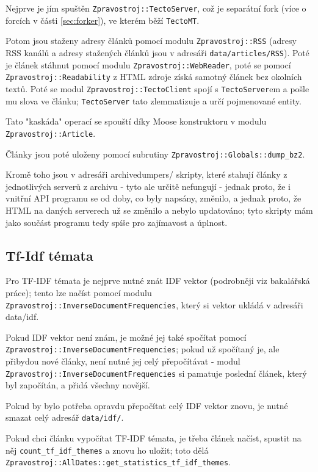 \documentclass[12pt,a4paper]{report}
\begin{document}
Nejprve je jím spuštěn \texttt{Zpravostroj::TectoServer}, což je separátní fork (více o forcích v části \ref{sec:forker}), ve kterém běží \texttt{TectoMT}.


Potom jsou staženy adresy článků pomocí modulu \texttt{Zpravostroj::RSS} (adresy RSS kanálů a adresy stažených článků jsou v adresáři \texttt{data/articles/RSS}). Poté je článek stáhnut pomocí modulu \texttt{Zpravostroj::WebReader}, poté se pomocí \texttt{Zpravostroj::Readability} z HTML zdroje získá samotný článek bez okolních textů. Poté se modul \texttt{Zpravostroj::TectoClient} spojí s \texttt{TectoServer}em a pošle mu slova ve článku; \texttt{TectoServer} tato zlemmatizuje a určí pojmenované entity.

Tato "kaskáda" operací se spouští díky Moose konstruktoru v modulu \texttt{Zpravostroj::Article}.

Články jsou poté uloženy pomocí subrutiny \texttt{Zpravostroj::Globals::dump\_bz2}.

Kromě toho jsou v adresáři archivedumpers/ skripty, které stahují články z jednotlivých serverů z archivu - tyto ale určitě nefungují - jednak proto, že i vnitřní API programu se od doby, co byly napsány, změnilo, a jednak proto, že HTML na daných serverech už se změnilo a nebylo updatováno; tyto skripty mám jako součást programu tedy spíše pro zajímavost a úplnost.

\subsection{Tf-Idf témata}

Pro TF-IDF témata je nejprve nutné znát IDF vektor (podrobněji viz bakalářská práce); tento lze načíst pomocí modulu \texttt{Zpravostroj::InverseDocumentFrequencies}, který si vektor ukládá v adresáři data/idf.

Pokud IDF vektor není znám, je možné jej také spočítat pomocí \texttt{Zpravostroj::InverseDocumentFrequencies}; pokud už spočítaný je, ale přibydou nové články, není nutné jej celý přepočítávat - modul \texttt{Zpravostroj::InverseDocumentFrequencies} si pamatuje poslední článek, který byl započítán, a přidá všechny novější.

Pokud by bylo potřeba opravdu přepočítat celý IDF vektor znovu, je nutné smazat celý adresář \texttt{data/idf/}.

Pokud chci článku vypočítat TF-IDF témata, je třeba článek načíst, spustit na něj \texttt{count\_tf\_idf\_themes} a znovu ho uložit; toto dělá \texttt{Zpravostroj::AllDates::get\_statistics\_tf\_idf\_themes}.
\end{document}
